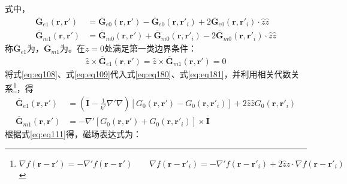 \documentclass{article}
\numberwithin{equation}{section}
\renewcommand{\vec}[1]{\boldsymbol{#1}}
\begin{document}
式中，
\begin{align}
    \label{eq:eq180}
    \overline{\mathbf{G}}_{e1}(\vec{r},\vec{r}')&=\overline{\mathbf{G}}_{e0}(\vec{r},\vec{r}')-\overline{\mathbf{G}}_{e0}(\vec{r},\vec{r}'_i)+2\overline{\mathbf{G}}_{e0}(\vec{r},\vec{r}'_i)\cdot\hat{z}\hat{z} \\
    \label{eq:eq181}
    \overline{\mathbf{G}}_{m1}(\vec{r},\vec{r}')&=\overline{\mathbf{G}}_{m0}(\vec{r},\vec{r}')+\overline{\mathbf{G}}_{m0}(\vec{r},\vec{r}'_i)-2\overline{\mathbf{G}}_{m0}(\vec{r},\vec{r}'_i)\cdot\hat{z}\hat{z}
\end{align}
称$\overline{\mathbf{G}}_{e1}$为\textbf{\color{blue}{第一类半空间电并矢格林函数}}，$\overline{\mathbf{G}}_{m1}$为\textbf{\color{blue}{第一类半空间磁并矢格林函数}}。在$z=0$处满足第一类边界条件：
\begin{align}
    \label{eq:eq182}
    \hat{z}\times\overline{\mathbf{G}}_{e1}(\vec{r},\vec{r}')=\hat{z}\times\overline{\mathbf{G}}_{m1}(\vec{r},\vec{r}')=0
\end{align}
将式\ref{eq:eq108}、式\ref{eq:eq109}代入式\ref{eq:eq180}、式\ref{eq:eq181}，并利用相关代数关系\footnote{$\nabla f(\vec{r}-\vec{r}')=-\nabla'f(\vec{r}-\vec{r}')\qquad\nabla f(\vec{r}-\vec{r}'_i)=-\nabla'f(\vec{r}-\vec{r}'_i)+2\hat{z}\hat{z}\cdot\nabla f(\vec{r}-\vec{r}'_i)$\label{fn:fn0}}，得
\begin{align}
    \label{eq:eq183}
    \overline{\mathbf{G}}_{e1}(\vec{r},\vec{r}')&=\left(\overline{\mathbf{I}}-\frac{1}{k^2}\nabla'\nabla\right)[G_0(\vec{r},\vec{r}')-G_0(\vec{r},\vec{r}'_i)]+2\hat{z}\hat{z}G_0(\vec{r},\vec{r}'_i) \\
    \label{eq:eq184}
    \overline{\mathbf{G}}_{m1}(\vec{r},\vec{r}')&=-\nabla'[G_0(\vec{r},\vec{r}')+G_0(\vec{r},\vec{r}'_i)]\times\overline{\mathbf{I}}
\end{align}
根据式\ref{eq:eq111}得，磁场表达式为：
\end{document}
